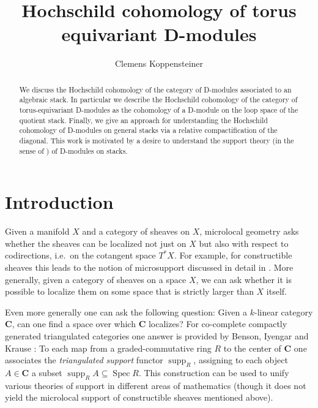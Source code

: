 \documentclass{oupau}
\theoremstyle{remark}
\DeclareMathOperator\Spec{Spec}
\newcommand\cat{\mathbf}                    %
\DeclareMathOperator\supp{supp}     %
\begin{document}
\title{Hochschild cohomology of torus equivariant D-modules}

\author{Clemens Koppensteiner}
\address{%
    Institute for Advanced Study, 1 Einstein Dr, Princeton, NJ 08540, USA
}

\received{}

\begin{abstract}%
  We discuss the Hochschild cohomology of the category of D-modules associated to an algebraic stack.
  In particular we describe the Hochschild cohomology of the category of torus-equivariant D-modules as the cohomology of a D-module on the loop space of the quotient stack.
  Finally, we give an approach for understanding the Hochschild cohomology of D-modules on general stacks via a relative compactification of the diagonal.
  This work is motivated by a desire to understand the support theory (in the sense of \cite{BensonIyengarKrause:2008:LocalCohomologyAndSupportForTriangulatedCategories}) of D-modules on stacks.
\end{abstract}


\maketitle

\setcounter{tocdepth}{1}
\tableofcontents

\section{Introduction}

Given a manifold $X$ and a category of sheaves on $X$, microlocal geometry asks whether the sheaves can be localized not just on $X$ but also with respect to codirections, i.e.~on the cotangent space $T^*X$.
For example, for constructible sheaves this leads to the notion of microsupport discussed in detail in \cite{KashiwaraSchapira:1994:SheavesOnManifolds}.
More generally, given a category of sheaves on a space $X$, we can ask whether it is possible to localize them on some space that is strictly larger than $X$ itself.

Even more generally one can ask the following question: Given a $k$-linear category $\cat C$, can one find a space over which $\cat C$ localizes?
For co-complete compactly generated triangulated categories one answer is provided by Benson, Iyengar and Krause \cite{BensonIyengarKrause:2008:LocalCohomologyAndSupportForTriangulatedCategories}:
To each map from a graded-commutative ring $R$ to the center of $\cat C$ one associates the \emph{triangulated support} functor $\supp_R$, assigning to each object $A ∈ \cat C$ a subset $\supp_R A \subseteq \Spec R$.
This construction can be used to unify various theories of support in different areas of mathematics (though it does not yield the microlocal support of constructible sheaves mentioned above).
\end{document}
